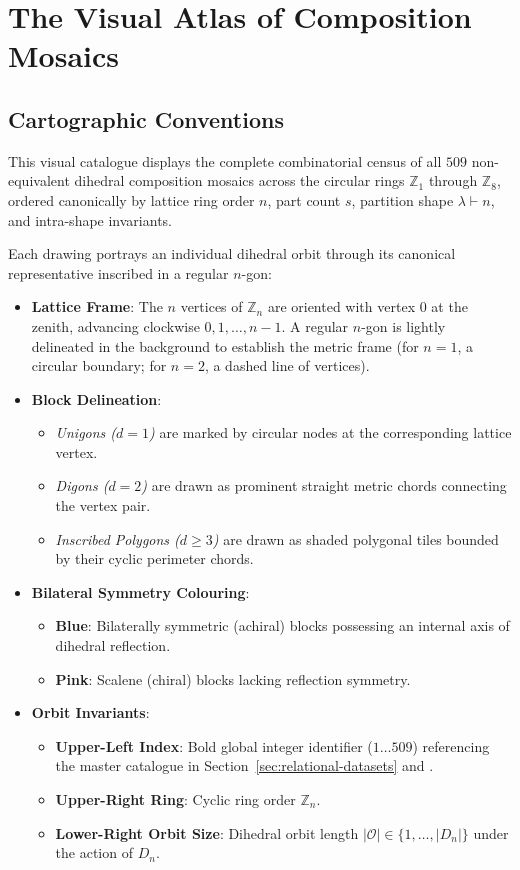 \chapter{The Visual Atlas of Composition Mosaics}
\label{chap:visual-atlas}

\section*{Cartographic Conventions}

This visual catalogue displays the complete combinatorial census of all $509$ non-equivalent dihedral composition mosaics across the circular rings $\mathbb{Z}_1$ through $\mathbb{Z}_8$, ordered canonically by lattice ring order $n$, part count $s$, partition shape $\lambda \vdash n$, and intra-shape invariants.

Each drawing portrays an individual dihedral orbit through its canonical representative inscribed in a regular $n$-gon:
\begin{itemize}
    \item \textbf{Lattice Frame}: The $n$ vertices of $\mathbb{Z}_n$ are oriented with vertex $0$ at the zenith, advancing clockwise $0, 1, \dots, n-1$. A regular $n$-gon is lightly delineated in the background to establish the metric frame (for $n=1$, a circular boundary; for $n=2$, a dashed line of vertices).
    \item \textbf{Block Delineation}:
    \begin{itemize}
        \item \emph{Unigons ($d=1$)} are marked by circular nodes at the corresponding lattice vertex.
        \item \emph{Digons ($d=2$)} are drawn as prominent straight metric chords connecting the vertex pair.
        \item \emph{Inscribed Polygons ($d \ge 3$)} are drawn as shaded polygonal tiles bounded by their cyclic perimeter chords.
    \end{itemize}
    \item \textbf{Bilateral Symmetry Colouring}:
    \begin{itemize}
        \item \textbf{Blue}: Bilaterally symmetric (achiral) blocks possessing an internal axis of dihedral reflection.
        \item \textbf{Pink}: Scalene (chiral) blocks lacking reflection symmetry.
    \end{itemize}
    \item \textbf{Orbit Invariants}:
    \begin{itemize}
        \item \textbf{Upper-Left Index}: Bold global integer identifier ($1 \dots 509$) referencing the master catalogue in Section~\ref{sec:relational-datasets} and .
        \item \textbf{Upper-Right Ring}: Cyclic ring order $\mathbb{Z}_n$.
        \item \textbf{Lower-Right Orbit Size}: Dihedral orbit length $|\mathcal{O}| \in \{1, \dots, |D_n|\}$ under the action of $D_n$.
    \end{itemize}
\end{itemize}

